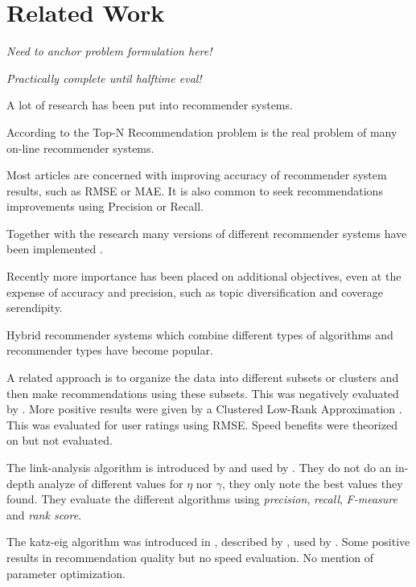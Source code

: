 \chapter{Related Work}\label{cha:relwork}

\textit{Need to anchor problem formulation here!}

\textit{Practically complete until halftime eval!}

A lot of research has been put into recommender systems.

According to \citep{lai2012hybrid} the Top-N Recommendation problem is the real problem of many on-line recommender systems.

Most articles are concerned with improving accuracy of recommender system results, such as RMSE or MAE. It is also common to seek recommendations improvements using Precision or Recall.  \citep{bobadilla2013recommender}

Together with the research many versions of different recommender systems have been implemented \citep{bobadilla2013recommender}.

Recently more importance has been placed on additional objectives, even at the expense of accuracy and precision, such as topic diversification and coverage serendipity. \citep{bobadilla2013recommender}

Hybrid recommender systems which combine different types of algorithms and recommender types have become popular. \citep{bobadilla2013recommender, lai2012hybrid}

A related approach is to organize the data into different subsets or clusters and then make recommendations using these subsets. This was negatively evaluated by \citep{cacheda2011comparison}. More positive results were given by a Clustered Low-Rank Approximation \citep{niklas, savas2011clustered}.  This was evaluated for user ratings using RMSE. Speed benefits were theorized on but not evaluated.

The link-analysis algorithm is introduced by \citep{huang2004link} and used by \citep{huang2007comparison}. They do not do an in-depth analyze of different values for $\eta$ nor $\gamma$, they only note the best values they found.
They evaluate the different algorithms using \textit{precision}, \textit{recall}, \textit{F-measure} and \textit{rank score}.

The katz-eig algorithm was introduced in \citep{katz1953new}, described by \citep{liben2007link}, used by \citep{shin2012multi}. Some positive results in recommendation quality but no speed evaluation. No mention of parameter optimization.


